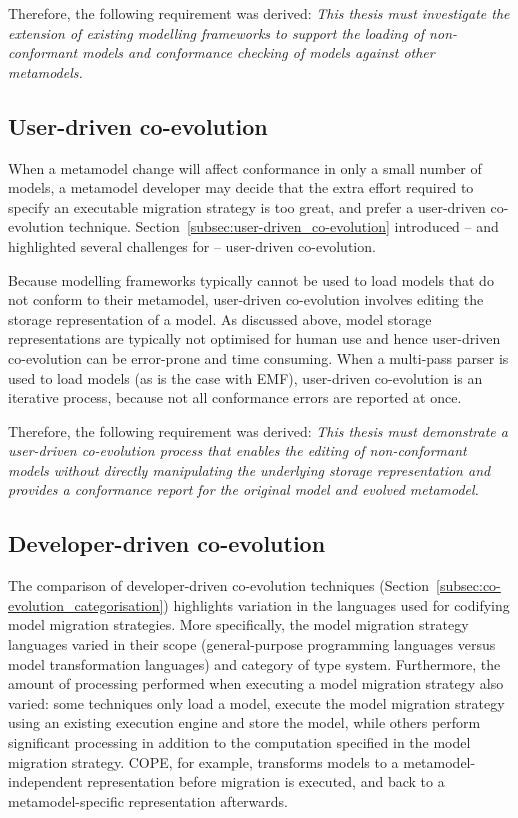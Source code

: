 Therefore, the following requirement was derived: \emph{This thesis must investigate the extension of existing modelling frameworks to support the loading of non-conformant models and conformance checking of models against other metamodels.}




\subsection{User-driven co-evolution}
When a metamodel change will affect conformance in only a small number of models, a metamodel developer may decide that the extra effort required to specify an executable migration strategy is too great, and prefer a user-driven co-evolution technique. Section~\ref{subsec:user-driven_co-evolution} introduced -- and highlighted several challenges for -- user-driven co-evolution.

Because modelling frameworks typically cannot be used to load models that do not conform to their metamodel, user-driven co-evolution involves editing the storage representation of a model. As discussed above, model storage representations are typically not optimised for human use and hence user-driven co-evolution can be error-prone and time consuming. When a multi-pass parser is used to load models (as is the case with EMF), user-driven co-evolution is an iterative process, because not all conformance errors are reported at once.

Therefore, the following requirement was derived: \emph{This thesis must demonstrate a user-driven co-evolution process that enables the editing of non-conformant models without directly manipulating the underlying storage representation and provides a conformance report for the original model and evolved metamodel.}


\subsection{Developer-driven co-evolution}
The comparison of developer-driven co-evolution techniques (Section~\ref{subsec:co-evolution_categorisation}) highlights variation in the languages used for codifying model migration strategies. More specifically, the model migration strategy languages varied in their scope (general-purpose programming languages versus model transformation languages) and category of type system. Furthermore, the amount of processing performed when executing a model migration strategy also varied: some techniques only load a model, execute the model migration strategy using an existing execution engine and store the model, while others perform significant processing in addition to the computation specified in the model migration strategy. COPE, for example, transforms models to a metamodel-independent representation before migration is executed, and back to a metamodel-specific representation afterwards.

